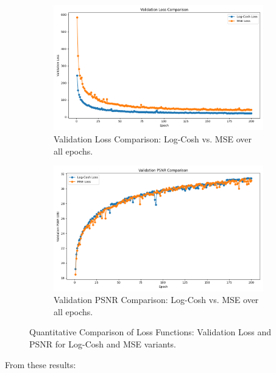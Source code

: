 \begin{figure}[h]
    \centering
    \begin{subfigure}[b]{0.49\textwidth}
        \includegraphics[width=\textwidth]{img/vae_results/val_loss_comparison.png}
        \caption{Validation Loss Comparison: Log-Cosh vs. MSE over all epochs.}
        \label{fig:val_loss_comparison}
    \end{subfigure}
    \hfill
    \begin{subfigure}[b]{0.49\textwidth}
        \includegraphics[width=\textwidth]{img/vae_results/val_psnr_comparison.png}
        \caption{Validation PSNR Comparison: Log-Cosh vs. MSE over all epochs.}
        \label{fig:val_psnr_comparison}
    \end{subfigure}
    
    \caption{Quantitative Comparison of Loss Functions: Validation Loss and PSNR for Log-Cosh and MSE variants.}
    \label{fig:quant_comparison}
\end{figure}


From these results:

